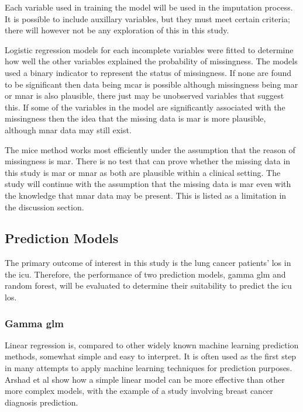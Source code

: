 \documentclass[11pt]{article}
\begin{document}
Each variable used in training the model will be used in the imputation process\cite{vanBuuren2018}. It is possible to include auxillary variables, but they must meet certain criteria; there will however not be any exploration of this in this study.

Logistic regression models for each incomplete variables were fitted to determine how well the other variables explained the probability of missingness. The models used a binary indicator to represent the status of missingness. If none are found to be significant then data being \gls{mcar} is possible although missingness being \gls{mar} or \gls{mnar} is also plausible, there just may be unobserved variables that suggest this. If some of the variables in the model are significantly associated with the missingness then the idea that the missing data is \gls{mar} is more plausible, although \gls{mnar} data may still exist.

The \gls{mice} method works most efficiently under the assumption that the reason of missingness is \gls{mar}. There is no test that can prove whether the missing data in this study is \gls{mar} or \gls{mnar} as both are plausible within a clinical setting. The study will continue with the assumption that the missing data is \gls{mar} even with the knowledge that \gls{mnar} data may be present. This is listed as a limitation in the discussion section.

\subsection{Prediction Models}
The primary outcome of interest in this study is the lung cancer patients' \gls{los} in the \gls{icu}. Therefore, the performance of two prediction models, gamma \gls{glm} and random forest, will be evaluated to determine their suitability to predict the \gls{icu} \gls{los}.

\subsubsection{Gamma \gls{glm}}
Linear regression is, compared to other widely known machine learning prediction methods, somewhat simple and easy to interpret. It is often used as the first step in many attempts to apply machine learning techniques for prediction purposes. Arshad et al show how a simple linear model can be more effective than other more complex models, with the example of a study involving breast cancer diagnosis prediction\cite{Arshad2023}. 
\end{document}
